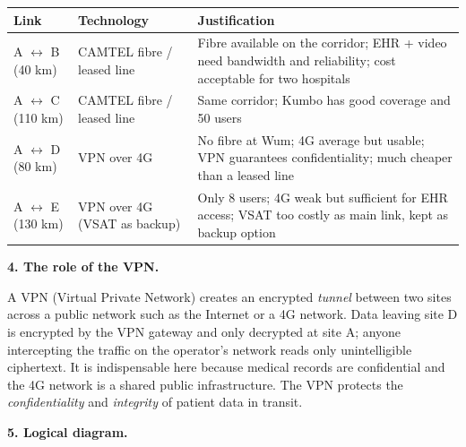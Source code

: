\documentclass[11pt]{article}
\newcommand{\cle}[1]{{\popxbold\color{popdark}#1}}
\begin{document}
\begin{center}
\begin{tabularx}{\linewidth}{|l|l|X|}
\hline
\rowcolor{popblueL} \textbf{Link} & \textbf{Technology} & \textbf{Justification} \\
\hline
A $\leftrightarrow$ B (40 km) & CAMTEL fibre / leased line & Fibre available on the corridor; EHR + video need bandwidth and reliability; cost acceptable for two hospitals \\
\hline
A $\leftrightarrow$ C (110 km) & CAMTEL fibre / leased line & Same corridor; Kumbo has good coverage and 50 users \\
\hline
A $\leftrightarrow$ D (80 km) & VPN over 4G & No fibre at Wum; 4G average but usable; VPN guarantees confidentiality; much cheaper than a leased line \\
\hline
A $\leftrightarrow$ E (130 km) & VPN over 4G (VSAT as backup) & Only 8 users; 4G weak but sufficient for EHR access; VSAT too costly as main link, kept as backup option \\
\hline
\end{tabularx}
\end{center}

\textbf{4. The role of the VPN.}

A \cle{VPN} (Virtual Private Network) creates an encrypted \emph{tunnel} between two sites across a public network such as the Internet or a 4G network. Data leaving site D is encrypted by the VPN gateway and only decrypted at site A; anyone intercepting the traffic on the operator's network reads only unintelligible ciphertext. It is indispensable here because medical records are confidential and the 4G network is a shared public infrastructure. The VPN protects the \emph{confidentiality} and \emph{integrity} of patient data in transit.

\textbf{5. Logical diagram.}
\end{document}
